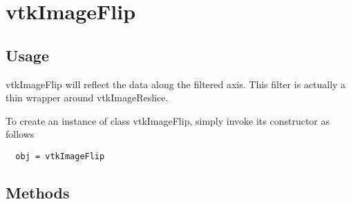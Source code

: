 \section{vtkImageFlip}

\subsection{Usage}

 vtkImageFlip will reflect the data along the filtered axis.  This filter is
 actually a thin wrapper around vtkImageReslice.

To create an instance of class vtkImageFlip, simply
invoke its constructor as follows
\begin{verbatim}
  obj = vtkImageFlip
\end{verbatim}
\subsection{Methods}

